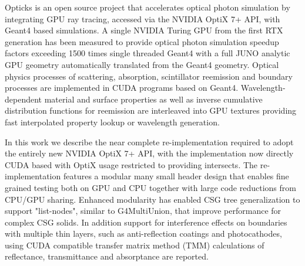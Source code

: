 Opticks is an open source project that accelerates optical photon simulation  
by integrating GPU ray tracing, accessed via the NVIDIA OptiX 7+ API, with 
Geant4 based simulations. 
A single NVIDIA Turing GPU from the first RTX generation has been measured to provide optical 
photon simulation speedup factors exceeding 1500 times single threaded Geant4 
with a full JUNO analytic GPU geometry automatically translated from the Geant4 geometry.
%
Optical physics processes of scattering, absorption, scintillator reemission and 
boundary processes are implemented in CUDA programs based on Geant4.
Wavelength-dependent material and surface properties as well as  
inverse cumulative distribution functions for reemission are interleaved into 
GPU textures providing fast interpolated property lookup or wavelength generation.
%

In this work we describe the near complete re-implementation required to adopt 
the entirely new NVIDIA OptiX 7+ API, with the implementation now directly CUDA 
based with OptiX usage restricted to providing intersects.  
The re-implementation features a modular many small header
design that enables fine grained testing both on GPU and CPU 
together with large code reductions from CPU/GPU sharing.  
Enhanced modularity has enabled CSG tree generalization to support "list-nodes", 
similar to G4MultiUnion, that improve performance for complex CSG solids.  
In addition support for interference effects on boundaries with multiple thin layers,
such as anti-reflection coatings and photocathodes, using CUDA compatible
transfer matrix method (TMM) calculations of reflectance, transmittance and
absorptance are reported.
